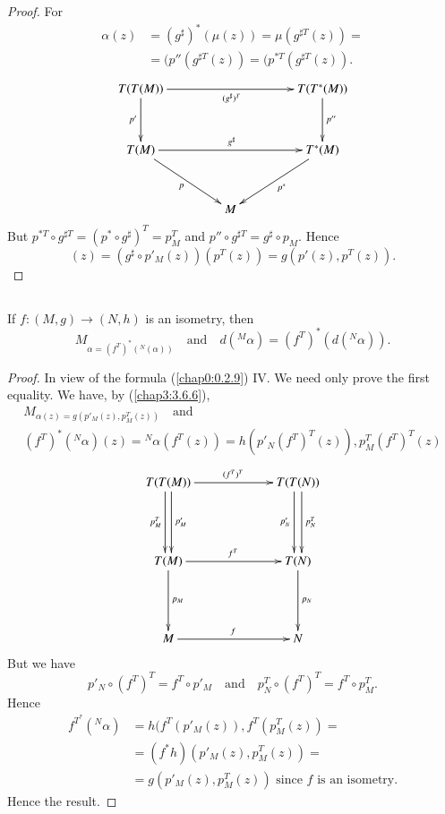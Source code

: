 \begin{proof}
For
\begin{align*}
\alpha(z) &= (g^{\sharp})^{\ast}(\mu(z))=\mu(g^{\sharp T}(z))=\\
          &= (p''(g^{\sharp T}(z))=(p^{\ast T}(g^{\sharp T}(z)).
\end{align*}
\[
\xymatrix@C=1.5cm@R=1.2cm{
T(T(M))\ar[rr]_{(g^{\sharp})^{T}}\ar[d]_{p'} & &
T(T^{\ast}(M))\ar[d]^{p''}\\
T(M)\ar[rr]^{g^{\sharp}}\ar[dr]_{p} & &
T^{\ast}(M)\ar[dl]^{p^{\ast}}\\
 & M & 
}
\]
But \pageoriginale $p^{\ast T}\circ g^{\sharp T}=(p^{\ast}\circ
g^{\sharp})^{T}=p^{T}_{M}$ and $p''\circ g^{\sharp T}=g^{\sharp}\circ
p_{M}$. Hence
$$
(z)=(g^{\sharp}\circ p'_{M}(z))(p^{T}(z))=g(p'(z),p^{T}(z)).
$$
\end{proof}

\subsection{}\label{chap3:3.6.7}
If $f:(M,g)\to (N,h)$ is an isometry, then
$$
M_{\alpha=(f^{T})^{\ast}({}^{N}(\alpha))}\quad\text{and}\quad
  d({}^{M}\alpha)=(f^{T})^{\ast}(d({}^N\alpha)). 
$$

\begin{proof}
In view of the formula (\ref{chap0:0.2.9}) IV. We need only prove the first
equality. We have, by (\ref{chap3:3.6.6}),
\begin{gather*}
M_{\alpha(z)=g(p'_{M}(z), p^{T}_{M}(z))}\quad\text{and}\\
(f^{T})^{\ast}({}^{N}\alpha)(z)={}^{N}\alpha(f^{T}(z))=h(p'_{N}(f^{T})^{T}(z)),
p^{T}_{M}(f^{T})^{T}(z) 
\end{gather*}
\[
\xymatrix@R=1.7cm@C=2.2cm{
T(T(M))\ar[r]^{(f^{T})^{T}}
\ar@<.25em>[d]^{p'_{M}}\ar@<-.25em>[d]_{p^{T}_{M}} &
T(T(N))\ar@<.3em>[d]^{p^{T}_{N}}\ar@<-.3em>[d]_{p'_{N}}\\
T(M)\ar[r]^{f^{T}}\ar[d]^{p_{M}} & T(N)\ar[d]^{p_{N}}\\
M\ar[r]^{f} & N
}
\]
But we have
$$
p'_{N}\circ (f^{T})^{T}=f^{T}\circ p'_{M}\quad\text{and}\quad
p^{T}_{N}\circ (f^{T})^{T}=f^{T}\circ p^{T}_{M}.
$$
Hence\pageoriginale
\begin{align*}
f^{T^{\ast}}({}^{N}\alpha) &=
h(f^{T}(p'_{M}(z)),f^{T}(p^{T}_{M}(z))=\\
&= (f^{\ast}h)(p'_{M}(z),p^{T}_{M}(z))=\\
&= g(p'_{M}(z),p^{T}_{M}(z))\text{ \ since $f$ is an isometry.}
\end{align*}
Hence the result.
\end{proof}

